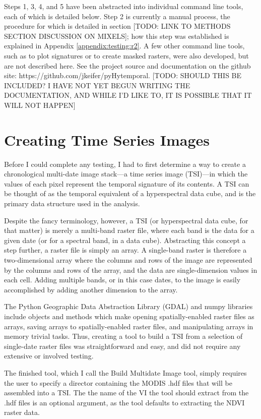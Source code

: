 Steps 1, 3, 4, and 5 have been abstracted into individual command line tools, each of which is detailed below. Step 2 is currently a manual process, the procedure for which is detailed in section [TODO: LINK TO METHODS SECTION DISCUSSION ON MIXELS]; how this step was established is explained in Appendix \ref{appendix:testing:r2}. A few other command line tools, such as to plot signatures or to create masked rasters, were also developed, but are not described here. See the project source and documentation on the github site: https://github.com/jkeifer/pyHytemporal. [TODO: SHOULD THIS BE INCLUDED? I HAVE NOT YET BEGUN WRITING THE DOCUMENTATION, AND WHILE I'D LIKE TO, IT IS POSSIBLE THAT IT WILL NOT HAPPEN]

\section{Creating Time Series Images}
\label{appendix:tools:build}

Before I could complete any testing, I had to first determine a way to create a chronological multi-date image stack---a time series image (TSI)---in which the values of each pixel represent the temporal signature of its contents. A TSI can be thought of as the temporal equivalent of a hyperspectral data cube, and is the primary data structure used in the analysis.

Despite the fancy terminology, however, a TSI (or hyperspectral data cube, for that matter) is merely a multi-band raster file, where each band is the data for a given date (or for a spectral band, in a data cube). Abstracting this concept a step further, a raster file is simply an array. A single-band raster is therefore a two-dimensional array where the columns and rows of the image are represented by the columns and rows of the array, and the data are single-dimension values in each cell. Adding multiple bands, or in this case dates, to the image is easily accomplished by adding another dimension to the array.

The Python Geographic Data Abstraction Library (GDAL) and numpy libraries include objects and methods which make opening spatially-enabled raster files as arrays, saving arrays to spatially-enabled raster files, and manipulating arrays in memory trivial tasks. Thus, creating a tool to build a TSI from a selection of single-date raster files was straightforward and easy, and did not require any extensive or involved testing.

The finished tool, which I call the Build Multidate Image tool, simply requires the user to specify a director containing the MODIS .hdf files that will be assembled into a TSI. The the name of the VI the tool should extract from the .hdf files is an optional argument, as the tool defaults to extracting the NDVI raster data.


